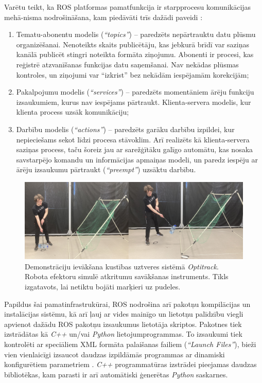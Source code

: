 \documentclass[12pt, a4paper]{article}
\numberwithin{equation}{section} %
\begin{document}
Varētu teikt, ka ROS platformas pamatfunkcija ir starpprocesu komunikācijas mehā-nisma nodrošināšana, kam piedāvāti trīs dažādi paveidi \cite{ros_comm_patterns}:

\begin{enumerate}
    \item Tematu-abonentu modelis (\textit{``topics''}) -- paredzēts nepārtrauktu datu plūsmu organizēšanai. Nenoteikts skaits publicētāju, kas jebkurā brīdī var saziņas kanālā publicēt stingri noteikta formāta ziņojumu. Abonenti ir procesi, kas reģistrē atzvanīšanas funkcijas datu saņemšanai. Nav nekādas plūsmas kontroles, un ziņojumi var ``izkrist'' bez nekādām iespējamām korekcijām;
    \item Pakalpojumu modelis (\textit{``services''}) -- paredzēts momentāniem ārēju funkciju izsaukumiem, kurus nav iespējams pārtraukt. Klienta-servera modelis, kur klienta process uzsāk komunikāciju;
    \item Darbību modelis (\textit{``actions''}) -- paredzēts garāku darbību izpildei, kur nepieciešams sekot līdzi procesa stāvoklim. Arī realizēts kā klienta-servera saziņas process, taču šoreiz jau ar sarežģītāku galīgo automātu, kas nosaka savstarpējo komandu un informācijas apmaiņas modeli, un paredz iespēju ar ārēju izsaukumu pārtraukt (\textit{``preempt''}) uzsāktu darbību.
\end{enumerate}


\begin{figure}[t!]
    \centering
    \includegraphics[width=16cm,page=1]{../img/throw_demo.jpg}
    \caption{Demonstrāciju ievākšana kustības uztveres sistēmā \textit{Optitrack}. Robota efektoru simulē atkritumu savākšanas instruments. Tīkls izgatavots, lai netiktu bojāti marķieri uz pudeles.}
\end{figure}

Papildus šai pamatinfrastrukūrai, ROS nodrošina arī pakotņu kompilācijas un instalācijas sistēmu, kā arī ļauj ar vides mainīgo un lietotņu palīdzību viegli apvienot dažādu ROS pakotņu izsaukumus lietotāja skriptos. Pakotnes tiek izstrādātas kā \textit{C++} un/vai \textit{Python} lietojumprogrammas. To izsaukumi tiek kontrolēti ar speciāliem XML formāta palaišanas failiem (\textit{``Launch Files''}), bieži vien vienlaicīgi izsaucot daudzas izpildāmās programmas ar dinamiski konfigurētiem parametriem \cite{roslaunch_file}. \textit{C++} programmatūras izstrādei pieejamas daudzas bibliotēkas, kam parasti ir arī automātiski ģenerētas \textit{Python} saskarnes.
\end{document}
